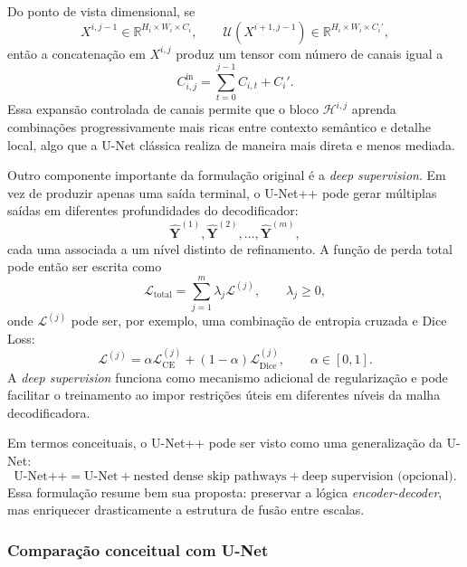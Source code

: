 \documentclass[tcc,capa]{texufpel}
\begin{document}
Do ponto de vista dimensional, se
\begin{equation}
	X^{i,j-1} \in \mathbb{R}^{H_i \times W_i \times C_i},
	\qquad
	\mathcal{U}(X^{i+1,j-1}) \in \mathbb{R}^{H_i \times W_i \times C_i'},
\end{equation}
então a concatenação em \(X^{i,j}\) produz um tensor com número de canais igual a
\begin{equation}
	C_{i,j}^{\text{in}}
	=
	\sum_{t=0}^{j-1} C_{i,t} + C_i'.
\end{equation}
Essa expansão controlada de canais permite que o bloco \(\mathcal{H}^{i,j}\) aprenda combinações progressivamente mais ricas entre contexto semântico e detalhe local, algo que a U-Net clássica realiza de maneira mais direta e menos mediada.

Outro componente importante da formulação original é a \textit{deep supervision}. Em vez de produzir apenas uma saída terminal, o U-Net++ pode gerar múltiplas saídas em diferentes profundidades do decodificador:
\begin{equation}
	\hat{\mathbf{Y}}^{(1)}, \hat{\mathbf{Y}}^{(2)}, \dots, \hat{\mathbf{Y}}^{(m)},
\end{equation}
cada uma associada a um nível distinto de refinamento. A função de perda total pode então ser escrita como
\begin{equation}
	\mathcal{L}_{\text{total}}
	=
	\sum_{j=1}^{m}\lambda_j \mathcal{L}^{(j)},
	\qquad
	\lambda_j \ge 0,
\end{equation}
onde \(\mathcal{L}^{(j)}\) pode ser, por exemplo, uma combinação de entropia cruzada e Dice Loss:
\begin{equation}
	\mathcal{L}^{(j)}
	=
	\alpha \mathcal{L}^{(j)}_{\text{CE}}
	+
	(1-\alpha)\mathcal{L}^{(j)}_{\text{Dice}},
	\qquad \alpha \in [0,1].
\end{equation}
A \textit{deep supervision} funciona como mecanismo adicional de regularização e pode facilitar o treinamento ao impor restrições úteis em diferentes níveis da malha decodificadora.

Em termos conceituais, o U-Net++ pode ser visto como uma generalização da U-Net:
\begin{equation}
	\text{U-Net++} = \text{U-Net} + \text{nested dense skip pathways} + \text{deep supervision (opcional)}.
\end{equation}
Essa formulação resume bem sua proposta: preservar a lógica \textit{encoder-decoder}, mas enriquecer drasticamente a estrutura de fusão entre escalas.

\subsubsection{Comparação conceitual com U-Net}
\end{document}
